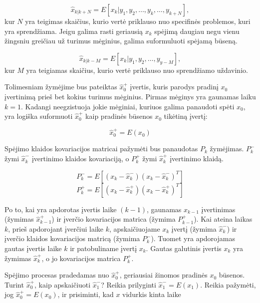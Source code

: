     \begin{equation}
        \hat{x}_{k|k+N} = E[x_k|y_1,y_2,\dots,y_k,\dots, y_{k+N}],
    \end{equation}
    kur $N$ yra teigimas skaičius, kurio vertė priklauso nuo specifinės problemos, kuri yra sprendžiama.
    Jeigu galima rasti geriausią $x_k$ spėjimą daugiau negu vienu žingsniu greičiau už turimus mėginius, galima suformuluoti spėjamą būseną.

    \begin{equation}
        \hat{x}_{k|k-M} = E[x_k|y_1,y_2, \dots, y_{y-M}],
    \end{equation}
    kur $M$ yra teigiamas skaičius, kurio vertė priklauso nuo sprendžiamo uždavinio. 

    Tolimesniam žymėjime bus pateiktas $\hat{x}_0^+$ įvertis, kuris parodys pradinį $x_0$ įvertinimą prieš bet kokius turimus mėginius.
    Pirmas mėginys yra gaunamas laiku $k=1$.
    Kadangi neegzistuoja jokie mėginiai, kuriuos galima panaudoti spėti $x_0$, yra logiška suformuoti $\hat{x}^+_0$ kaip pradinės būsenos $x_0$ tikėtiną įvertį:

    \begin{equation}
        \hat{x}_0^+ = E(x_0)
    \end{equation}

    Spėjimo klaidos kovariacijos matricai pažymėti bus panaudotas $P_k$ žymėjimas.
    $P_k^-$ žymi $\hat{x}_k^-$ įvertinimo klaidos kovariaciją, o $P_k^+$ žymi $\hat{x}_k^+$ įvertinimo klaidą.

    \begin{equation}
        P_k^- = E[(x_k - \hat{x}_k^-)(x_k - \hat{x}_k^-)^T]
    \end{equation}
    \begin{equation}
        P_k^+ = E[(x_k - \hat{x}_k^+)(x_k-\hat{x}_k^+)^T]
    \end{equation}

    Po to, kai yra apdorotas įvertis laike $(k-1)$, gaunamas $x_{k-1}$ įvertinimas (žymimas $\hat{x}_{k-1}^+$) ir įverčio kovariacijos matrica (žymima $P_{k-1}^+$).
    Kai ateina laikas $k$, prieš apdorojant įverčiui laike $k$, apskaičiuojame $x_k$ įvertį (žymima $\hat{x}_k^-$) ir įverčio klaidos kovariacijos matricą (žymima $P_k^-$).
    Tuomet yra apdorojamas gautas įvertis laike $k$ ir patobuliname įvertį $x_k$.
    Gautas galutinis įvertis $x_k$ yra žymimas $\hat{x}_k^+$, o jo kovariacijos matrica $P_k^+$.

    Spėjimo procesas pradedamas nuo $\hat{x}_0^+$, geriausiai žinomos pradinės $x_0$ būsenos.
    Turint $\hat{x}_0^+$, kaip apskaičiuoti $\hat{x}_1^-$?
    Reikia prilyginti $\hat{x}_1^- = E(x_1)$.
    Reikia pažymėti, jog $\hat{x}_0^+ = E(x_0)$, ir prisiminti, kad $x$ vidurkis kinta laike

